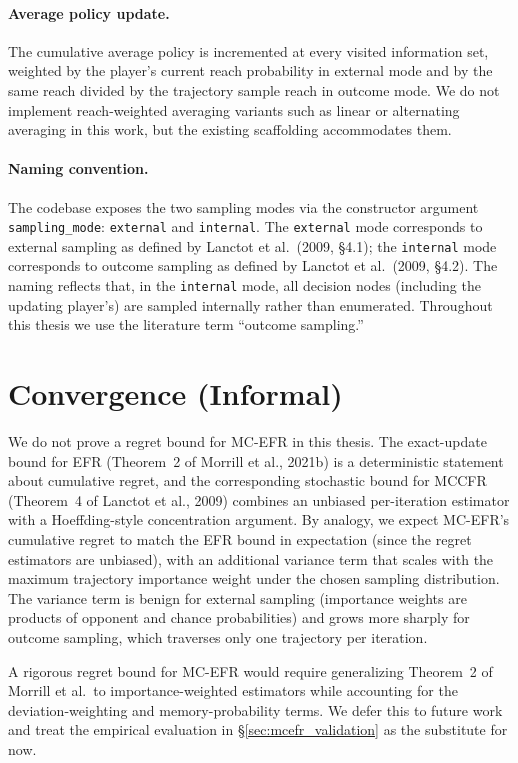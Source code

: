 \documentclass[11pt]{article}
\begin{document}
\paragraph{Average policy update.} The cumulative average policy is incremented at every visited information set, weighted by the player's current reach probability in external mode and by the same reach divided by the trajectory sample reach in outcome mode. We do not implement reach-weighted averaging variants such as linear or alternating averaging in this work, but the existing scaffolding accommodates them.

\paragraph{Naming convention.} The codebase exposes the two sampling modes via the constructor argument \texttt{sampling\_mode}: \texttt{external} and \texttt{internal}. The \texttt{external} mode corresponds to external sampling as defined by Lanctot et al.\ (2009, \S4.1); the \texttt{internal} mode corresponds to outcome sampling as defined by Lanctot et al.\ (2009, \S4.2). The naming reflects that, in the \texttt{internal} mode, all decision nodes (including the updating player's) are sampled internally rather than enumerated. Throughout this thesis we use the literature term ``outcome sampling.''

\section{Convergence (Informal)}
\label{sec:mcefr_conv}

We do not prove a regret bound for MC-EFR in this thesis. The exact-update bound for EFR (Theorem~2 of Morrill et al., 2021b) is a deterministic statement about cumulative regret, and the corresponding stochastic bound for MCCFR (Theorem~4 of Lanctot et al., 2009) combines an unbiased per-iteration estimator with a Hoeffding-style concentration argument. By analogy, we expect MC-EFR's cumulative regret to match the EFR bound in expectation (since the regret estimators are unbiased), with an additional variance term that scales with the maximum trajectory importance weight under the chosen sampling distribution. The variance term is benign for external sampling (importance weights are products of opponent and chance probabilities) and grows more sharply for outcome sampling, which traverses only one trajectory per iteration.

A rigorous regret bound for MC-EFR would require generalizing Theorem~2 of Morrill et al.\ to importance-weighted estimators while accounting for the deviation-weighting and memory-probability terms. We defer this to future work and treat the empirical evaluation in \S\ref{sec:mcefr_validation} as the substitute for now.
\end{document}
